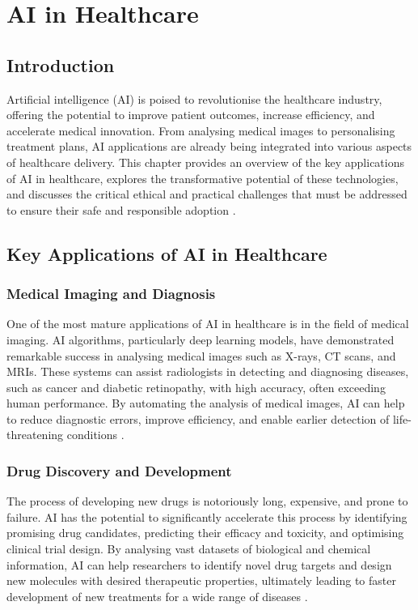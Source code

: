 \chapter{AI in Healthcare}
\label{cha:ai_in_healthcare}

\section{Introduction}

Artificial intelligence (AI) is poised to revolutionise the healthcare industry, offering the potential to improve patient outcomes, increase efficiency, and accelerate medical innovation. From analysing medical images to personalising treatment plans, AI applications are already being integrated into various aspects of healthcare delivery. This chapter provides an overview of the key applications of AI in healthcare, explores the transformative potential of these technologies, and discusses the critical ethical and practical challenges that must be addressed to ensure their safe and responsible adoption \parencite{jiang2017artificial}.

\section{Key Applications of AI in Healthcare}

\subsection{Medical Imaging and Diagnosis}

One of the most mature applications of AI in healthcare is in the field of medical imaging. AI algorithms, particularly deep learning models, have demonstrated remarkable success in analysing medical images such as X-rays, CT scans, and MRIs. These systems can assist radiologists in detecting and diagnosing diseases, such as cancer and diabetic retinopathy, with high accuracy, often exceeding human performance. By automating the analysis of medical images, AI can help to reduce diagnostic errors, improve efficiency, and enable earlier detection of life-threatening conditions \parencite{mintz2019introduction}.

\subsection{Drug Discovery and Development}

The process of developing new drugs is notoriously long, expensive, and prone to failure. AI has the potential to significantly accelerate this process by identifying promising drug candidates, predicting their efficacy and toxicity, and optimising clinical trial design. By analysing vast datasets of biological and chemical information, AI can help researchers to identify novel drug targets and design new molecules with desired therapeutic properties, ultimately leading to faster development of new treatments for a wide range of diseases \parencite{jiang2017artificial}.


